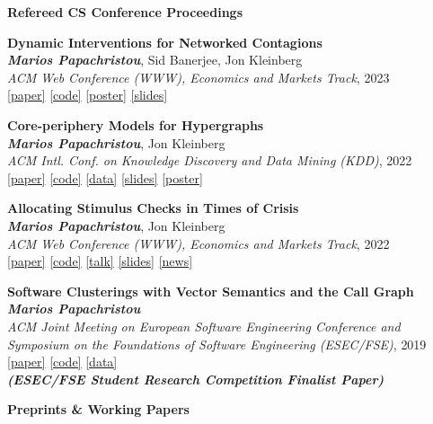 \documentclass[margin]{res}
\newcommand{\field}[2]{\noindent \textbf{#1} \hfill #2 \\}
\newcommand{\specialurl}[2]{\href {#2} {{{[#1]}}}}
\newcommand{\code}[1]{\specialurl {code} {#1}}
\newcommand{\data}[1]{\specialurl {data} {#1}}
\newcommand{\talk}[1]{\specialurl {talk} {#1}}
\newcommand{\slides}[1]{\specialurl {slides} {#1}}
\newcommand{\poster}[1]{\specialurl {poster} {#1}}
\newcommand{\paper}[1]{\specialurl {paper} {#1}}
\newcommand{\authorref}[1]{{\textit{\textbf{#1}}}}
\newcommand{\news}[1]{\specialurl {news} {#1}}
\newcommand{\authorme}{\authorref{Marios Papachristou}}
\newcommand{\publication}[5]{\textbf{#1}\\{#2}\\\emph{#3}, {#4}\\{#5}\smallskip}
\begin{document}
\begin{resume}
{\begin{enumerate}[nosep, label={[J\arabic*]}]
\end{enumerate}}

\field{Refereed CS Conference Proceedings}{}{
\begin{enumerate}[nosep, label={[C\arabic*]}]    
 
   \item \publication{Dynamic Interventions for Networked Contagions}{\authorme, Sid Banerjee, Jon Kleinberg}{ACM Web Conference (WWW), Economics and Markets Track}{2023}{\paper{https://dl.acm.org/doi/abs/10.1145/3543507.3583470} \code{https://github.com/papachristoumarios/dynamic-clearing} \poster{https://drive.google.com/file/d/1l0TCsoZNo3NoOOHsPSh1ofctXD4ivFir/view?usp=sharing}
		\slides{https://drive.google.com/file/d/1ZZ6F6PFNsBjYKFyurkwM2IbenuzXJEAs/view?usp=share_link}}

   \item \publication{Core-periphery Models for Hypergraphs}{\authorme, Jon Kleinberg}{ACM Intl. Conf. on Knowledge Discovery and Data Mining (KDD)}{2022}{\paper{https://arxiv.org/abs/2206.00783} \code{https://doi.org/10.5281/zenodo.5965849} \data{https://doi.org/10.5281/zenodo.5943043} \slides{https://drive.google.com/file/d/1k9pjPaeDtg7jhUivjlEmyunimcUb-DxL/view?usp=sharing} \poster{https://drive.google.com/file/d/1RJ3C7KKhTemfj5OBAiEXUHMVp-TJhTDs/view?usp=sharing}}
   \item \publication{Allocating Stimulus Checks in Times of Crisis}{\authorme, Jon Kleinberg}{ACM Web Conference (WWW), Economics and Markets Track}{2022}{\paper{https://doi.org/10.1145/3485447.3512047} \code{https://github.com/papachristoumarios/financial-contagion}  \talk{https://youtu.be/WUmPBztK8Mo} \slides{https://drive.google.com/file/d/1v4v4jPOTzFtP8a5dhAFLoIjZSRDxAjBz/view?usp=sharing} \news{https://www.minneapolisfed.org/article/2022/social-policy-in-the-age-of-algorithms-an-interview-with-jon-kleinberg}}   
      \item \publication{Software Clusterings with Vector Semantics and the Call Graph}{\authorme}{ACM Joint Meeting on European Software Engineering Conference and Symposium on the Foundations of Software Engineering (ESEC/FSE)}{2019}{\paper{https://dl.acm.org/citation.cfm?id=3342483} \code{https://github.com/papachristoumarios/sade} \data{http://doi.org/10.5281/zenodo.2652487} \\\textbf{\emph{(ESEC/FSE Student Research Competition Finalist Paper)}}}
    
\end{enumerate}}


\field{Preprints \& Working Papers}{}{
\begin{enumerate}[nosep, label={[WP\arabic*]}]  


\end{enumerate}}
\end{resume}
\end{document}
